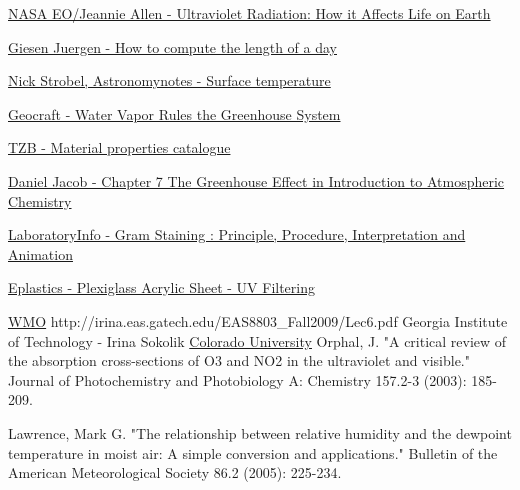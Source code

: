 \documentclass{cfp}
\begin{document}
\begin{thebibliography}{}

      
      
   \href{https://earthobservatory.nasa.gov/Features/UVB/}{NASA EO/Jeannie Allen - 	
Ultraviolet Radiation: How it Affects Life on Earth}

   \href{http://www.jgiesen.de/astro/solarday.htm}{Giesen Juergen - How to compute the length of a day}
  
    \href{http://www.astronomynotes.com/solarsys/s3c.htm} {Nick Strobel, Astronomynotes - Surface temperature}
    
    \href{http://www.geocraft.com/WVFossils/greenhouse_data.html} {Geocraft - Water Vapor Rules the Greenhouse System}


    \href{https://stavba.tzb-info.cz/docu/tabulky/0000/000086_katalog.html}{TZB - Material properties catalogue}


    \href{http://acmg.seas.harvard.edu/people/faculty/djj/book/bookchap7.html}{Daniel Jacob - Chapter 7 The Greenhouse Effect in Introduction to Atmospheric Chemistry}

\href{https://laboratoryinfo.com/gram-staining-principle-procedure-interpretation-and-animation/} {LaboratoryInfo - Gram Staining : Principle, Procedure, Interpretation and Animation}

\href{http://www.eplastics.com/plexiglass_acrylic_sheet_uv_filter} {Eplastics - Plexiglass Acrylic Sheet - UV Filtering}

 \href{http://www.wmo.int/pages/prog/arep/gaw/documents/FINAL\_GAW\_218.pdf}{WMO}
 http://irina.eas.gatech.edu/EAS8803\_Fall2009/Lec6.pdf {Georgia Institute of Technology - Irina Sokolik}
 \href{https://www.colorado.edu/chemistry/volkamer/publications/group-pubs/thalman-2014-rscsNArO2air-accepted.pdf}{Colorado University}
 Orphal, J. "A critical review of the absorption cross-sections of O3 and NO2 in the ultraviolet and visible." Journal of Photochemistry and Photobiology A: Chemistry 157.2-3 (2003): 185-209.

 Lawrence, Mark G. "The relationship between relative humidity and the dewpoint temperature in moist air: A simple conversion and applications." Bulletin of the American Meteorological Society 86.2 (2005): 225-234.


\end{thebibliography}
\end{document}
